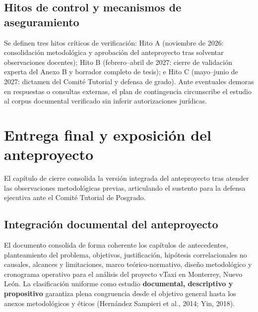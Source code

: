 {\subsection{Hitos de control y mecanismos de aseguramiento}
Se definen tres hitos críticos de verificación: Hito A (noviembre de 2026: consolidación metodológica y aprobación del anteproyecto tras solventar observaciones docentes); Hito B (febrero--abril de 2027: cierre de validación experta del Anexo B y borrador completo de tesis); e Hito C (mayo--junio de 2027: dictamen del Comité Tutorial y defensa de grado). Ante eventuales demoras en respuestas o consultas externas, el plan de contingencia circunscribe el estudio al corpus documental verificado sin inferir autorizaciones jurídicas.

\section{Entrega final y exposición del anteproyecto}
El capítulo de cierre consolida la versión integrada del anteproyecto tras atender las observaciones metodológicas previas, articulando el sustento para la defensa ejecutiva ante el Comité Tutorial de Posgrado.

\subsection{Integración documental del anteproyecto}
El documento consolida de forma coherente los capítulos de antecedentes, planteamiento del problema, objetivos, justificación, hipótesis correlacionales no causales, alcances y limitaciones, marco teórico-normativo, diseño metodológico y cronograma operativo para el análisis del proyecto vTaxi en Monterrey, Nuevo León. La clasificación uniforme como estudio \textbf{documental, descriptivo y propositivo} garantiza plena congruencia desde el objetivo general hasta los anexos metodológicos y éticos (Hernández Sampieri et al., 2014; Yin, 2018).

}
